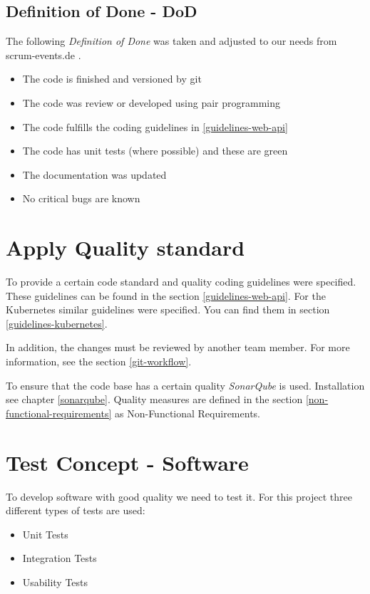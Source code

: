 \subsection{Definition of Done - DoD}
The following \textit{Definition of Done} was taken and adjusted to our needs from scrum-events.de \cite{www.scrum-events.de_dod}.
\begin{itemize}
  \item The code is finished and versioned by git
  \item The code was review or developed using pair programming
  \item The code fulfills the coding guidelines in \ref{guidelines-web-api}
  \item The code has unit tests (where possible) and these are green
  \item The documentation was updated
  \item No critical bugs are known
\end{itemize}

\section{Apply Quality standard}
To provide a certain code standard and quality coding guidelines were specified.
These guidelines can be found in the section \ref{guidelines-web-api}.
For the Kubernetes similar guidelines were specified.
You can find them in section \ref{guidelines-kubernetes}.

In addition, the changes must be reviewed by another team member.
For more information, see the section \ref{git-workflow}.

To ensure that the code base has a certain quality \textit{SonarQube} is used.
Installation see chapter \ref{sonarqube}.
Quality measures are defined in the section \ref{non-functional-requirements} as Non-Functional Requirements.


\section{Test Concept - Software}
To develop software with good quality we need to test it.
For this project three different types of tests are used:

\begin{itemize}
  \item Unit Tests
  \item Integration Tests
  \item Usability Tests
\end{itemize}

